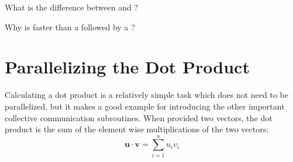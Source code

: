 













\begin{problem}
What is the difference between  and ?
\end{problem}

\begin{problem}
Why is  faster than a  followed by a ?
\end{problem}



\section*{Parallelizing the Dot Product}
Calculating a dot product is a relatively simple task which does not need to be parallelized, but it makes a good example for introducing the other important collective communication subroutines. When provided two vectors, the dot product is the sum of the element wise multiplications of the two vectors:
\[
\textbf{u} \cdot \textbf{v} = \sum_{i=1}^{n} u_i v_i
\]

